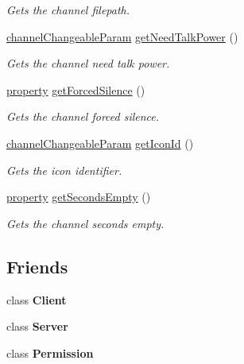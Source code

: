 \begin{DoxyCompactItemize}
\begin{DoxyCompactList}\small\item\em Gets the channel filepath. \end{DoxyCompactList}\item 
\hyperlink{struct_ts3_api_1_1_channel_1_1channel_changeable_param}{channel\+Changeable\+Param} \hyperlink{class_ts3_api_1_1_channel_ab38a596734ecc93a019c4aa50b4324c5}{get\+Need\+Talk\+Power} ()
\begin{DoxyCompactList}\small\item\em Gets the channel need talk power. \end{DoxyCompactList}\item 
\hyperlink{struct_ts3_api_1_1property}{property} \hyperlink{class_ts3_api_1_1_channel_a0dbe0383820514a042d27ac38cbb5cce}{get\+Forced\+Silence} ()
\begin{DoxyCompactList}\small\item\em Gets the channel forced silence. \end{DoxyCompactList}\item 
\hyperlink{struct_ts3_api_1_1_channel_1_1channel_changeable_param}{channel\+Changeable\+Param} \hyperlink{class_ts3_api_1_1_channel_a23be361507d0eb269c84c736e3501c07}{get\+Icon\+Id} ()
\begin{DoxyCompactList}\small\item\em Gets the icon identifier. \end{DoxyCompactList}\item 
\hyperlink{struct_ts3_api_1_1property}{property} \hyperlink{class_ts3_api_1_1_channel_afbaae870da911877f6c39795e685fa17}{get\+Seconds\+Empty} ()
\begin{DoxyCompactList}\small\item\em Gets the channel seconds empty. \end{DoxyCompactList}\end{DoxyCompactItemize}
\subsection*{Friends}
\begin{DoxyCompactItemize}
\item 
class {\bfseries Client}\hypertarget{class_ts3_api_1_1_channel_a5db1c99e2c94b26278f3838c85cdb618}{}\label{class_ts3_api_1_1_channel_a5db1c99e2c94b26278f3838c85cdb618}

\item 
class {\bfseries Server}\hypertarget{class_ts3_api_1_1_channel_ac2055578ac48afabe5af487878450f68}{}\label{class_ts3_api_1_1_channel_ac2055578ac48afabe5af487878450f68}

\item 
class {\bfseries Permission}\hypertarget{class_ts3_api_1_1_channel_ad3834bbd6b2c4839e7f69dc4cc1d6ae6}{}\label{class_ts3_api_1_1_channel_ad3834bbd6b2c4839e7f69dc4cc1d6ae6}

\end{DoxyCompactItemize}


